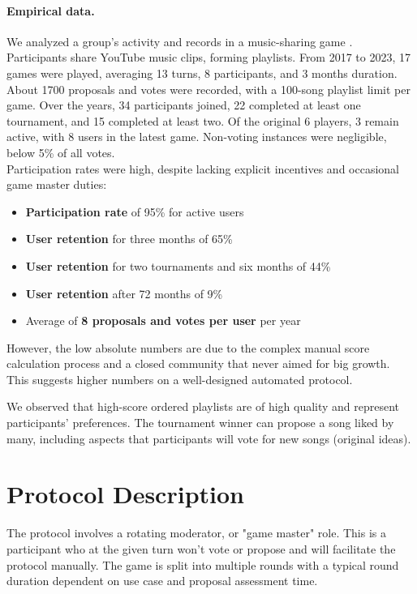 \documentclass{article}
\begin{document}
\begin{CJK}{UTF8}{gbsn}
\begin{multicols}{2}
        \paragraph{Empirical data.} We analyzed a group's activity and records in a music-sharing game \cite{DariusYoutube}. Participants share YouTube music clips, forming playlists. From 2017 to 2023, 17 games were played, averaging 13 turns, 8 participants, and 3 months duration. About 1700 proposals and votes were recorded, with a 100-song playlist limit per game. Over the years, 34 participants joined, 22 completed at least one tournament, and 15 completed at least two. Of the original 6 players, 3 remain active, with 8 users in the latest game. Non-voting instances were negligible, below 5\% of all votes. \\
        Participation rates were high, despite lacking explicit incentives and occasional game master duties:
        \begin{itemize}[nosep]
            \item \textbf{Participation rate} of 95\% for active users
            \item \textbf{User retention} for three months of 65\%
            \item \textbf{User retention} for two tournaments and six months of 44\%
            \item \textbf{User retention} after 72 months of 9\%
            \item Average of \textbf{8 proposals and votes per user} per year
        \end{itemize}

        However, the low absolute numbers are due to the complex manual score calculation process and a closed community that never aimed for big growth. This suggests higher numbers on a well-designed automated protocol.

        We observed that high-score ordered playlists are of high quality and represent participants' preferences. The tournament winner can propose a song liked by many, including aspects that participants will vote for new songs (original ideas).

        \section{Protocol Description}
        The protocol involves a rotating moderator, or "game master" role. This is a participant who at the given turn won't vote or propose and will facilitate the protocol manually. The game is split into multiple rounds with a typical round duration dependent on use case and proposal assessment time.


\end{multicols}
\end{CJK}
\end{document}
